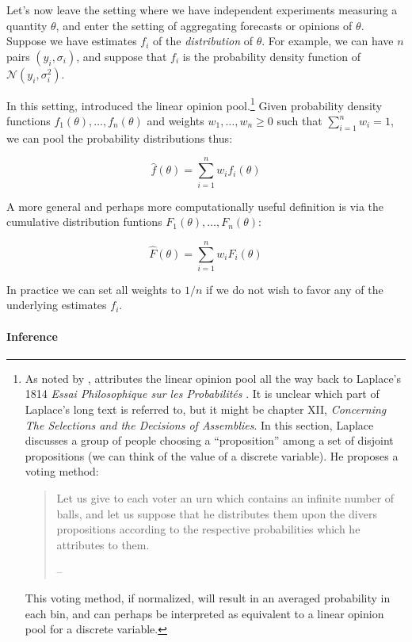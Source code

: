 \documentclass[12pt]{article}
\begin{document}
Let's now leave the setting where we have independent experiments measuring a quantity $\theta$, and enter the setting of aggregating forecasts or opinions of $\theta$. Suppose we have estimates $f_i$ of the \emph{distribution} of $\theta$. For example, we can have $n$ pairs $(y_i,\sigma_i)$, and suppose that $f_i$ is the probability density function of $\mathcal{N}(y_i,\sigma_i^2)$.

In this setting, \cite{stone1961opinion} introduced the linear opinion pool.\footnote{As noted by \cite{koepke2017consensus}, \cite{bacharach1979normal} attributes the linear opinion pool all the way back to Laplace's 1814 \emph{Essai Philosophique sur les Probabilités} \citep{laplace1951essay}. It is unclear which part of Laplace's long text is referred to, but it might be chapter XII, \emph{Concerning The Selections and the Decisions of Assemblies}. In this section, Laplace discusses a group of people choosing a ``proposition'' among a set of disjoint propositions (we can think of the value of a discrete variable). He proposes a voting method:
  \begin{quote}Let us give to each voter an urn which contains an infinite number of balls, and let us suppose that he distributes them upon the divers propositions according to the respective probabilities which he attributes to them.

  \hfill -- \citet[pg. 130]{laplace1951essay}\end{quote}

  This voting method, if normalized, will result in an averaged probability in each bin, and can perhaps be interpreted as equivalent to a linear opinion pool for a discrete variable.} Given probability density functions $f_1(\theta),\ldots,f_n(\theta)$ and weights $w_1,\ldots,w_n\geq 0$ such that $\sum_{i=1}^n w_i=1$, we can pool the probability distributions thus:

\[\hat f(\theta)=\sum_{i=1}^n w_if_i(\theta)\]

A more general and perhaps more computationally useful definition is via the cumulative distribution funtions $F_1(\theta),\ldots,F_n(\theta)$:

\[\hat F(\theta)=\sum_{i=1}^n w_iF_i(\theta)\]

In practice we can set all weights to $1/n$ if we do not wish to favor any of the underlying estimates $f_i$.

\paragraph{Inference}\label{inference-6}
\end{document}
